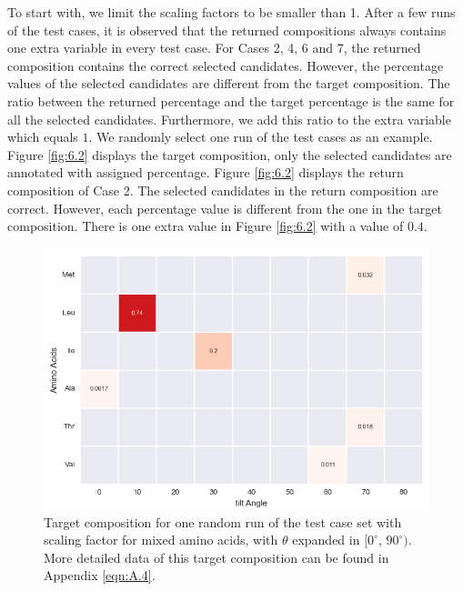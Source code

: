 To start with, we limit the scaling factors to be smaller than 1. After a few runs of the test cases, it is observed that the returned compositions always contains one extra variable in every test case. For Cases 2, 4, 6 and 7, the returned composition contains the correct selected candidates. However, the percentage values of the selected candidates are different from the target composition. The ratio between the returned percentage and the target percentage is the same for all the selected candidates. Furthermore, we add this ratio to the extra variable which equals $1$. We randomly select one run of the test cases as an example. Figure \ref{fig:6.2} displays the target composition, only the selected candidates are annotated with assigned percentage. Figure \ref{fig:6.2} displays the return composition of Case 2. The selected candidates in the return composition are correct. However, each percentage value is different from the one in the target composition. There is one extra value in Figure \ref{fig:6.2} with a value of $0.4$. \\

\begin{figure}[!ht] 
\centering
\includegraphics[scale=0.7]{Figures/chapter6_figure_one.png}
\caption{Target composition for one random run of the test case set with scaling factor for mixed amino acids, with $\theta$ expanded in $[0^{\circ}$, $90^{\circ})$. More detailed data of this target composition can be found in Appendix \ref{eqn:A.4}.} \label{fig:6.1}
\end{figure}

